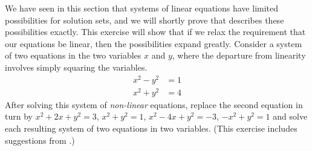 We have seen in this section that systems of linear equations have limited possibilities for solution sets, and we will shortly prove  that describes these possibilities exactly.  This exercise will show that if we relax the requirement that our equations be linear, then the possibilities expand greatly.  Consider a system of two equations in the two variables $x$ and $y$, where the departure from linearity involves simply squaring the variables.
%
\begin{align*}
x^2-y^2&=1\\
x^2+y^2&=4
\end{align*}
%
After solving this system of {\em non-linear} equations, replace the second equation in turn by $x^2+2x+y^2=3$, $x^2+y^2=1$, $x^2-4x+y^2=-3$, $-x^2+y^2=1$ and solve each resulting system of two equations in two variables.  (This exercise includes suggestions from \donkreher.)